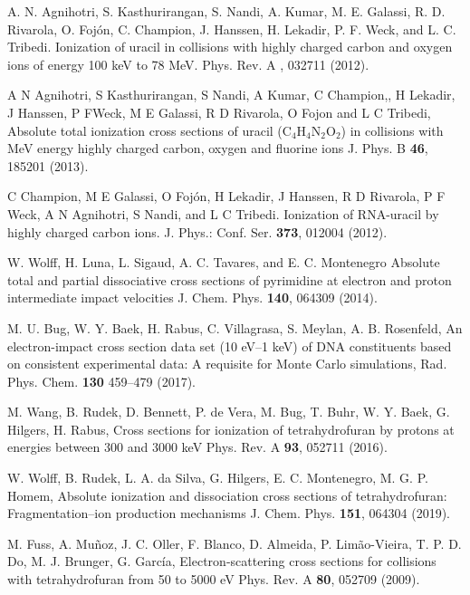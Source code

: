\documentclass[preprint,12pt]{article}
\begin{document}
\begin{thebibliography}{99}

A. N. Agnihotri, S. Kasthurirangan, S. Nandi, A.
Kumar, M. E. Galassi, R. D. Rivarola, O. Foj\'{o}n, C. Champion, J. Hanssen,
H. Lekadir, P. F. Weck, and L. C. Tribedi. 
Ionization of uracil in collisions with highly charged carbon and oxygen 
ions of energy 100 keV to 78 MeV. 
Phys. Rev. A , 032711 (2012).

A N Agnihotri, S Kasthurirangan, S Nandi, A Kumar, C Champion,, H Lekadir, 
J Hanssen, P FWeck, M E Galassi, R D Rivarola, O Fojon and L C Tribedi, 
Absolute total ionization cross sections of uracil (C$_4$H$_4$N$_2$O$_2$) in 
collisions with MeV energy highly charged carbon, oxygen and fluorine ions
J. Phys. B \textbf{46}, 185201 (2013).

C Champion, M E Galassi, O Foj\'{o}n, H Lekadir, J Hanssen, R D Rivarola,
P F Weck, A N Agnihotri, S Nandi, and L C Tribedi. 
Ionization of RNA-uracil by highly charged carbon ions.
J. Phys.: Conf. Ser. \textbf{373}, 012004 (2012).

W. Wolff, H. Luna, L. Sigaud, A. C. Tavares, and E. C. Montenegro
Absolute total and partial dissociative cross sections of pyrimidine
at electron and proton intermediate impact velocities
J. Chem. Phys. \textbf{140}, 064309 (2014).

M. U. Bug, W. Y. Baek, H. Rabus, C. Villagrasa, S. Meylan, A. B. Rosenfeld,
An electron-impact cross section data set (10 eV--1 keV) of DNA
constituents based on consistent experimental data: A requisite for 
Monte Carlo simulations,
Rad. Phys. Chem. \textbf{130} 459--479 (2017).

M. Wang, B. Rudek, D. Bennett, P. de Vera, M. Bug, T. Buhr, W. Y. Baek, 
G. Hilgers, H. Rabus, 
Cross sections for ionization of tetrahydrofuran by protons at energies 
between 300 and 3000 keV
Phys. Rev. A \textbf{93}, 052711 (2016).

W. Wolff, B. Rudek, L. A. da Silva, G. Hilgers, E. C. Montenegro, 
M. G. P. Homem,
Absolute ionization and dissociation cross sections of tetrahydrofuran:
Fragmentation--ion production mechanisms
J. Chem. Phys. \textbf{151}, 064304 (2019).

M. Fuss, A. Muñoz, J. C. Oller, F. Blanco, D. Almeida, P. Limão-Vieira, 
T. P. D. Do, M. J. Brunger, G. García,
Electron-scattering cross sections for collisions with tetrahydrofuran 
from 50 to 5000 eV
Phys. Rev. A \textbf{80}, 052709 (2009).


\end{thebibliography}
\end{document}
